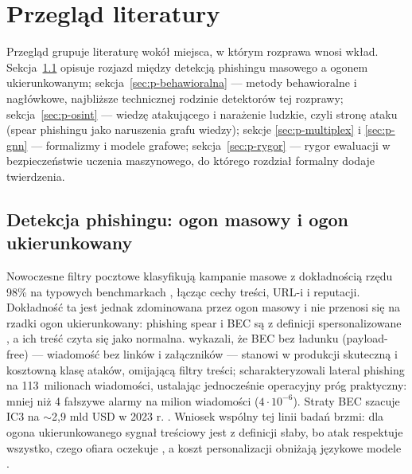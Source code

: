 \chapter{Przegląd literatury}
\label{rozd:przeglad}

Przegląd grupuje literaturę wokół miejsca, w którym rozprawa wnosi
wkład. Sekcja~\ref{sec:p-ogon} opisuje rozjazd między detekcją phishingu
masowego a ogonem ukierunkowanym; sekcja~\ref{sec:p-behawioralna} ---
metody behawioralne i nagłówkowe, najbliższe technicznej rodzinie
detektorów tej rozprawy; sekcja~\ref{sec:p-osint} --- wiedzę
atakującego i narażenie ludzkie, czyli stronę ataku
(spear phishingu jako naruszenia grafu wiedzy); sekcje
\ref{sec:p-multiplex} i \ref{sec:p-gnn} --- formalizmy i modele
grafowe; sekcja~\ref{sec:p-rygor} --- rygor ewaluacji w bezpieczeństwie
uczenia maszynowego, do którego rozdział formalny dodaje twierdzenia.

\section{Detekcja phishingu: ogon masowy i ogon ukierunkowany}
\label{sec:p-ogon}

Nowoczesne filtry pocztowe klasyfikują kampanie masowe z dokładnością
rzędu 98\% na typowych benchmarkach \citep{birthriya2025detection,
tan2020graph}, łącząc cechy treści, URL-i i reputacji. Dokładność ta
jest jednak zdominowana przez ogon masowy i nie przenosi się na rzadki
ogon ukierunkowany: phishing spear i BEC są z definicji spersonalizowane
\citep{birthriya2025detection}, a ich treść czyta się jako normalna.
\citet{cidon2019high} wykazali, że BEC bez ładunku (payload-free) ---
wiadomość bez linków i załączników --- stanowi w produkcji skuteczną
i kosztowną klasę ataków, omijającą filtry treści;
\citet{ho2019detecting} scharakteryzowali lateral phishing na
113~milionach wiadomości, ustalając jednocześnie operacyjny próg
praktyczny: mniej niż 4 fałszywe alarmy na milion wiadomości
($4\cdot10^{-6}$). Straty BEC szacuje IC3 na $\sim$2{,}9 mld USD
w 2023 r. \citep{fbi2024ic3}. Wniosek wspólny tej linii badań brzmi:
dla ogona ukierunkowanego sygnał treściowy jest z definicji słaby,
bo atak respektuje wszystko, czego ofiara oczekuje
\citep{butavicius2022why,sturman2025security,dewan2014analyzing},
a koszt personalizacji obniżają językowe modele
\citep{bethany2024evaluating,brown2025web}.


